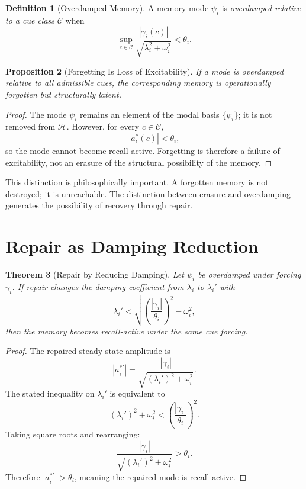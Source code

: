 \documentclass[12pt, oneside]{book}
\theoremstyle{plain}
\newtheorem{theorem}{Theorem}[chapter]
\newtheorem{proposition}[theorem]{Proposition}
\theoremstyle{definition}
\newtheorem{definition}[theorem]{Definition}
\theoremstyle{remark}
\newcommand{\calH}{\mathcal{H}}
\begin{document}
\begin{definition}[Overdamped Memory]
A memory mode $\psi_i$ is \emph{overdamped relative to a
cue class} $\mathcal{C}$ when
\[
  \sup_{c \in \mathcal{C}}
  \frac{|\gamma_i(c)|}{\sqrt{\lambda_i^2 + \omega_i^2}}
  < \theta_i.
\]
\end{definition}

\begin{proposition}[Forgetting Is Loss of Excitability]
\label{prop:forgetting}
If a mode is overdamped relative to all admissible cues,
the corresponding memory is operationally forgotten
but structurally latent.
\end{proposition}

\begin{proof}
The mode $\psi_i$ remains an element of the modal basis
$\{\psi_i\}$; it is not removed from $\calH$.
However, for every $c \in \mathcal{C}$,
\[
  |a_i^*(c)| < \theta_i,
\]
so the mode cannot become recall-active.
Forgetting is therefore a failure of excitability,
not an erasure of the structural possibility of the memory.
\end{proof}

This distinction is philosophically important.
A forgotten memory is not destroyed; it is unreachable.
The distinction between erasure and overdamping generates
the possibility of recovery through repair.

\section{Repair as Damping Reduction}

\begin{theorem}[Repair by Reducing Damping]
\label{thm:repair}
Let $\psi_i$ be overdamped under forcing $\gamma_i$.
If repair changes the damping coefficient from $\lambda_i$
to $\lambda_i'$ with
\[
  \lambda_i' < \sqrt{\left(\frac{|\gamma_i|}{\theta_i}\right)^2
                     - \omega_i^2},
\]
then the memory becomes recall-active under the same cue forcing.
\end{theorem}

\begin{proof}
The repaired steady-state amplitude is
\[
  |a_i^{*\prime}| = \frac{|\gamma_i|}{\sqrt{(\lambda_i')^2 + \omega_i^2}}.
\]
The stated inequality on $\lambda_i'$ is equivalent to
\[
  (\lambda_i')^2 + \omega_i^2
  < \left(\frac{|\gamma_i|}{\theta_i}\right)^2.
\]
Taking square roots and rearranging:
\[
  \frac{|\gamma_i|}{\sqrt{(\lambda_i')^2 + \omega_i^2}} > \theta_i.
\]
Therefore $|a_i^{*\prime}| > \theta_i$,
meaning the repaired mode is recall-active.
\end{proof}
\end{document}
